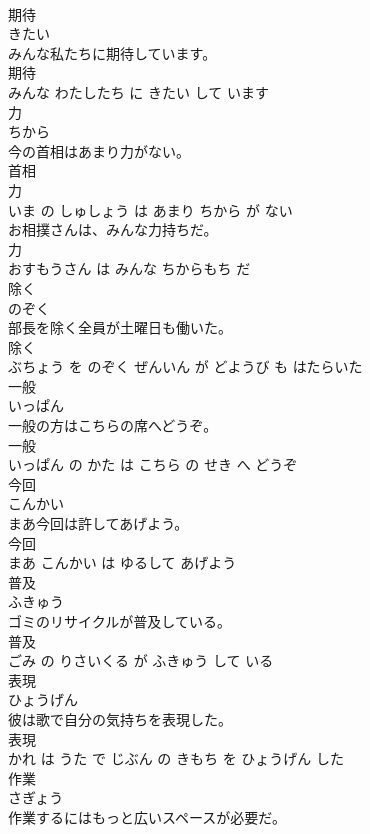 \documentclass[8pt]{extreport}
\begin{document}
\begin{CJK}{UTF8}{min}
\\	期待	
\\	きたい			
\\	みんな私たちに期待しています。	
\\	期待 
\\	みんな わたしたち に きたい して います			
\\	力	
\\	ちから			
\\	今の首相はあまり力がない。	
\\	首相 
\\	力 
\\	いま の しゅしょう は あまり ちから が ない			
\\	お相撲さんは、みんな力持ちだ。	
\\	力 
\\	おすもうさん は みんな ちからもち だ			
\\	除く	
\\	のぞく			
\\	部長を除く全員が土曜日も働いた。	
\\	除く 
\\	ぶちょう を のぞく ぜんいん が どようび も はたらいた			
\\	一般	
\\	いっぱん			
\\	一般の方はこちらの席へどうぞ。	
\\	一般 
\\	いっぱん の かた は こちら の せき へ どうぞ			
\\	今回	
\\	こんかい			
\\	まあ今回は許してあげよう。	
\\	今回 
\\	まあ こんかい は ゆるして あげよう			
\\	普及	
\\	ふきゅう			
\\	ゴミのリサイクルが普及している。	
\\	普及 
\\	ごみ の りさいくる が ふきゅう して いる			
\\	表現	
\\	ひょうげん			
\\	彼は歌で自分の気持ちを表現した。	
\\	表現 
\\	かれ は うた で じぶん の きもち を ひょうげん した			
\\	作業	
\\	さぎょう			
\\	作業するにはもっと広いスペースが必要だ。	

\end{CJK}
\end{document}
